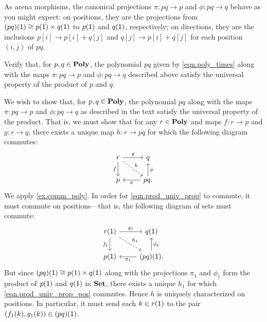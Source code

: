 \documentclass[Book-Poly]{subfiles}
\begin{document}
As arena morphisms, the canonical projections $\pi \colon pq \to p$ and $\phi \colon pq \to q$ behave as you might expect: on positions, they are the projections from $(pq)(\textsf{1}) \cong p(\textsf{1}) \times q(\textsf{1})$ to $p(\textsf{1})$ and $q(\textsf{1})$, respectively; on directions, they are the inclusions $p[i] \to p[i] + q[j]$ and $q[j] \to p[i] + q[j]$ for each position $(i, j)$ of $pq$.

\begin{exercise} \label{exc.poly_prod}
Verify that, for $p, q \in \mathbf{Poly}$, the polynomial $pq$ given by \eqref{eqn.poly_times} along with the maps $\pi \colon pq \to p$ and $\phi \colon pq \to q$ described above satisfy the universal property of the product of $p$ and $q$.
\begin{solution}
We wish to show that, for $p, q \in \mathbf{Poly}$, the polynomial $pq$ along with the maps $\pi \colon pq \to p$ and $\phi \colon pq \to q$ as described in the text satisfy the universal property of the product.
That is, we must show that for any $r \in \mathbf{Poly}$ and maps $f \colon r \to p$ and $g \colon r \to q$, there exists a unique map $h \colon r \to pq$ for which the following diagram commutes:
\begin{equation} \label{eqn.prod_univ_prop}
\begin{tikzcd}
	r \ar[d, "f"'] \ar[r, "g"] \ar[dr, "h", dashed] & q \\
	p & pq. \ar[l, "\pi"] \ar[u, "\phi"'] 
\end{tikzcd}
\end{equation}
We apply \cref{ex.comm_poly}.
In order for \eqref{eqn.prod_univ_prop} to commute, it must commute on positions---that is, the following diagram of sets must commute:
\begin{equation} \label{eqn.prod_univ_prop_pos}
\begin{tikzcd}
	r(\1) \ar[d, "f_1"'] \ar[r, "g_1"] \ar[dr, "h_1", dashed] & q(\1) \\
	p(\1) & (pq)(\1). \ar[l, "\pi_1"] \ar[u, "\phi_1"'] 
\end{tikzcd}
\end{equation}
But since $(pq)(\textsf{1}) \cong p(1) \times q(\textsf{1})$ along with the projections $\pi_1$ and $\phi_1$ form the product of $p(\textsf{1})$ and $q(\textsf{1})$ in $\mathbf{Set}$, there exists a unique $h_1$ for which \eqref{eqn.prod_univ_prop_pos} commutes.
Hence $h$ is uniquely characterized on positions.
In particular, it must send each $k \in r(\textsf{1})$ to the pair $(f_1(k), g_1(k)) \in (pq)(\textsf{1})$.


\end{solution}
\end{exercise}
\end{document}
